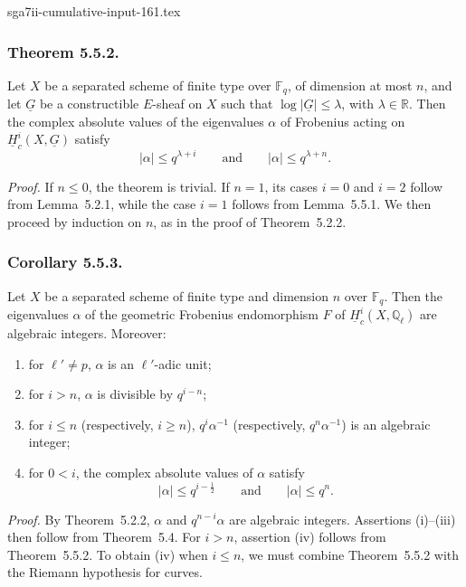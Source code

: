 \begin{filecontents*}{sga7ii-cumulative-input-161.tex}
\subsubsection*{Theorem 5.5.2.}
Let $X$ be a separated scheme of finite type over $\mathbb F_q$, of
dimension at most $n$, and let $\underline G$ be a constructible $E$-sheaf
on $X$ such that $\log|\underline G|\leq\lambda$, with
$\lambda\in\mathbb R$.  Then the complex absolute values of the eigenvalues
$\alpha$ of Frobenius acting on $\underline H_c^i(X,\underline G)$ satisfy
\[
|\alpha|\leq q^{\lambda+i}
\qquad\text{and}\qquad
|\alpha|\leq q^{\lambda+n}.
\]

\medskip
\noindent\emph{Proof.}
If $n\leq0$, the theorem is trivial.  If $n=1$, its cases $i=0$ and $i=2$
follow from Lemma~5.2.1, while the case $i=1$ follows from
Lemma~5.5.1.  We then proceed by induction on $n$, as in the proof of
Theorem~5.2.2.

\subsubsection*{Corollary 5.5.3.}
Let $X$ be a separated scheme of finite type and dimension $n$ over
$\mathbb F_q$.  Then the eigenvalues $\alpha$ of the geometric Frobenius
endomorphism $F$ of $\underline H_c^i(X,\mathbb Q_\ell)$ are algebraic
integers.  Moreover:
\begin{enumerate}[label=(\roman*)]
\item for $\ell'\ne p$, $\alpha$ is an $\ell'$-adic unit;
\item for $i>n$, $\alpha$ is divisible by $q^{i-n}$;
\item for $i\leq n$ (respectively, $i\geq n$),
  $q^i\alpha^{-1}$ (respectively, $q^n\alpha^{-1}$) is an algebraic integer;
\item for $0<i$, the complex absolute values of $\alpha$ satisfy
  \[
  |\alpha|\leq q^{i-\frac12}
  \qquad\text{and}\qquad
  |\alpha|\leq q^n.
  \]
\end{enumerate}

\medskip
\noindent\emph{Proof.}
By Theorem~5.2.2, $\alpha$ and $q^{n-i}\alpha$ are algebraic integers.
Assertions (i)--(iii) then follow from Theorem~5.4.  For $i>n$, assertion
(iv) follows from Theorem~5.5.2.  To obtain (iv) when $i\leq n$, we must
combine Theorem~5.5.2 with the Riemann hypothesis for curves.


\end{filecontents*}
